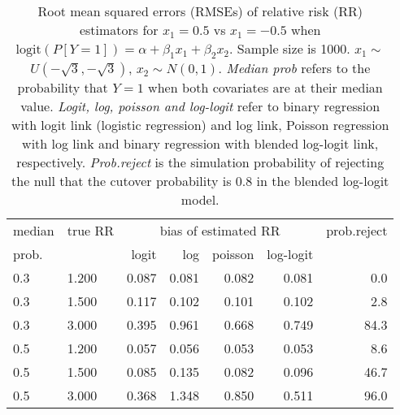 \documentclass[12pt,a4paper]{article}
\begin{document}
\begin{table}[H] 
\small\sf\centering 
\caption{Root mean squared errors (RMSEs) of relative risk (RR) estimators for $x_1=0.5$ vs $x_1=-0.5$ when $\mbox{logit}(P[Y=1])=\alpha+\beta_1 x_1 + \beta_2 x_2$. Sample size is 1000. $x_1 \sim $$U(-\sqrt{3},-\sqrt{3})$, $x_2 \sim N(0,1)$. {\it Median prob} refers to the probability that $Y=1$ when both covariates are at their median value. {\it Logit, log, poisson and log-logit} refer to binary regression with logit link (logistic regression) and log link, Poisson regression with log link and binary regression with blended log-logit link, respectively. {\it Prob.reject} is the simulation probability of rejecting the null that the cutover probability is $0.8$ in the blended log-logit model.} 
\begin{tabular}{llrrrrr} 
\toprule 
median & true RR & \multicolumn{4}{c}{bias of estimated RR} & prob.reject \\ 
prob. & & logit & log & poisson & log-logit  & \\ \midrule 
0.3 & 1.200 & 0.087 & 0.081 & 0.082 & 0.081 &  0.0 \\  
0.3 & 1.500 & 0.117 & 0.102 & 0.101 & 0.102 &  2.8 \\  
0.3 & 3.000 & 0.395 & 0.961 & 0.668 & 0.749 & 84.3 \\  
0.5 & 1.200 & 0.057 & 0.056 & 0.053 & 0.053 &  8.6 \\  
0.5 & 1.500 & 0.085 & 0.135 & 0.082 & 0.096 & 46.7 \\  
0.5 & 3.000 & 0.368 & 1.348 & 0.850 & 0.511 & 96.0 \\  
\bottomrule 
\end{tabular} 
\end{table} 
\end{document}
